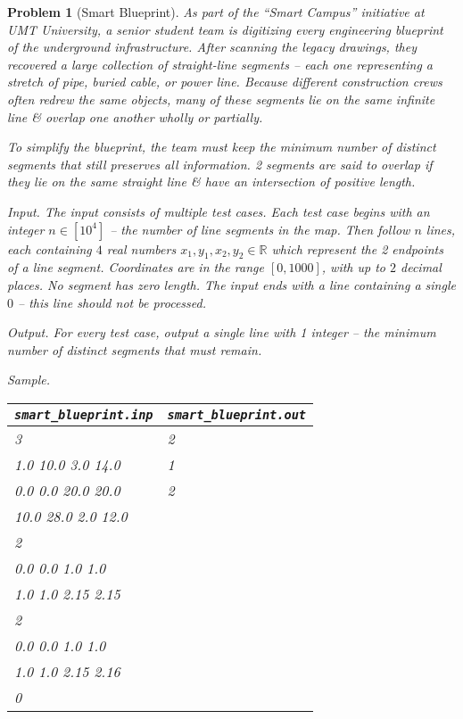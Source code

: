 \documentclass{article}
\newtheorem{problem}{Problem}
\begin{document}
 \begin{problem}[Smart Blueprint]
     As part of the ``Smart Campus'' initiative at UMT University, a senior student team is digitizing every engineering blueprint of the underground infrastructure. After scanning the legacy drawings, they recovered a large collection of straight-line segments -- each one representing a stretch of pipe, buried cable, or power line. Because different construction crews often redrew the same objects, many of these segments lie on the {\rm same} infinite line \& overlap one another wholly or partially.
     
     To simplify the blueprint, the team must keep the {\rm minimum number of distinct segments} that still preserves all information. 2 segments are said to {\rm overlap} if they lie on the same straight line \& have an intersection of positive length.
     \item {\sf Input.} The input consists of multiple test cases. Each test case begins with an integer $n\in[10^4]$ -- the number of line segments in the map. Then follow $n$ lines, each containing $4$ real numbers $x_1,y_1,x_2,y_2\in\mathbb{R}$ which represent the 2 endpoints of a line segment. Coordinates are in the range $[0,1000]$, with up to $2$ decimal places. No segment has zero length. The input ends with a line containing a single $0$ -- this line should not be processed.
     \item {\sf Output.} For every test case, output a single line with 1 integer -- the minimum number of distinct segments that must remain.
     \item {\sf Sample.}
     \begin{table}[H]
         \centering
         \begin{tabular}{|l|l|}
             \hline
             \verb|smart_blueprint.inp| & \verb|smart_blueprint.out| \\
             \hline
             3 & 2 \\
             1.0 10.0 3.0 14.0 & 1 \\
             0.0 0.0 20.0 20.0 & 2 \\
             10.0 28.0 2.0 12.0 &  \\
             2 &  \\
             0.0 0.0 1.0 1.0 &  \\
             1.0 1.0 2.15 2.15 &  \\
             2 &  \\
             0.0 0.0 1.0 1.0 &  \\
             1.0 1.0 2.15 2.16 &  \\
             0 &  \\
             \hline
         \end{tabular}
     \end{table}     
 \end{problem}
 
\end{document}
